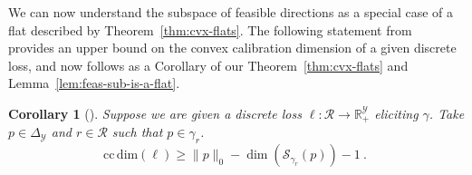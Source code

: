 \documentclass{article}
\newcommand{\reals}{\mathbb{R}}
\newcommand{\simplex}{\Delta_\Y}
\newcommand{\ccdim}{\mathrm{cc\,dim}}
\newcommand{\R}{\mathcal{R}}
\newcommand{\Sc}{\mathcal{S}}  %
\newcommand{\Y}{\mathcal{Y}}
\newtheorem{corollary}{Corollary}
\begin{document}
We can now understand the subspace of feasible directions as a special case of a flat described by Theorem~\ref{thm:cvx-flats}.
The following statement from~\cite{ramaswamy2016convex} provides an upper bound on the convex calibration dimension of a given discrete loss, and now follows as a Corollary of our Theorem~\ref{thm:cvx-flats} and Lemma~\ref{lem:feas-sub-is-a-flat}.

\begin{corollary}[\cite{ramaswamy2016convex}]\label{cor:fsd-bound}
	Suppose we are given a discrete loss $\ell:\R \to \reals^\Y_+$ eliciting $\gamma$.
	Take $p \in \simplex$ and $r \in \R$ such that $p \in \gamma_r$.
	\begin{equation}
	\ccdim(\ell) \geq \|p\|_0 - \dim(\Sc_{\gamma_r}(p)) - 1~.~
	\end{equation}
\end{corollary}
\end{document}
